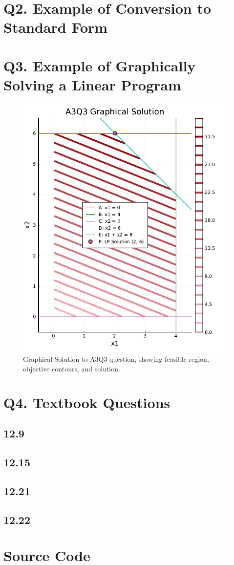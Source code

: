 \documentclass{article}
\begin{document}
    \section{Q2. Example of Conversion to Standard Form}

    \section{Q3. Example of Graphically Solving a Linear Program}

    \begin{figure}[H]
        \centering
        \includegraphics[width=0.5\linewidth]{A3Q3_Plot.pdf}
        \caption{Graphical Solution to A3Q3 question, showing feasible region, objective contours, and solution.}
        \label{fig:A3Q3_GraphicalSolution}
    \end{figure}

    \section{Q4. Textbook Questions}

    \subsection{12.9}

    \subsection{12.15}

    \subsection{12.21}

    \subsection{12.22}


    \newpage
    \appendix

    \section{Source Code}
\end{document}
